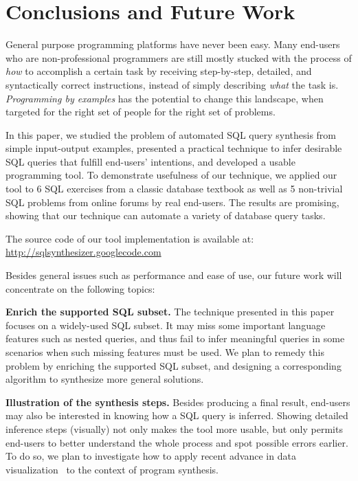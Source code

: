 \section{Conclusions and Future Work}
\label{sec:conclusion}

General purpose programming platforms have never been easy. Many end-users
who are non-professional programmers are still mostly stucked with the process
of \textit{how} to accomplish a certain task by receiving 
step-by-step, detailed, and syntactically correct instructions, instead of simply describing
\textit{what} the task is. \textit{Programming by examples} has the potential
to change this landscape, when targeted for the right set of people for the
right set of problems.

In this paper, we studied the problem of automated SQL query synthesis
from simple input-output examples, presented a practical technique to 
infer desirable SQL queries that fulfill end-users' intentions, and
developed a usable programming tool.
To demonstrate usefulness of our technique, we applied our tool
to 6 SQL exercises from a classic database textbook as well as
5 non-trivial SQL problems from online forums by real end-users. 
The results are promising, showing that our technique can automate a variety of database
query tasks.

The source code of our tool implementation is available at: \\
\url{http://sqlsynthesizer.googlecode.com}

\vspace{1mm}

Besides general issues such as performance and ease of use, our future
work will concentrate on the following topics:

\textbf{Enrich the supported SQL subset.} The technique 
presented in this paper focuses on a widely-used SQL subset.
It may miss some important language features such as
nested queries, and thus fail to infer meaningful queries
in some scenarios when such missing features must be used.
We plan to remedy this problem by enriching the
supported SQL subset, and designing a corresponding algorithm
to synthesize more general solutions.

\textbf{Illustration of the synthesis steps.} Besides
producing a final result, end-users may also be interested in knowing
how a SQL query is inferred.  Showing detailed inference steps (visually) not
only makes the tool more usable, but only permits
end-users to better understand the whole process and spot possible errors earlier.
To do so, we plan to investigate how to apply recent advance in data
visualization~\cite{Kandel:2011}
to the context of program synthesis.


